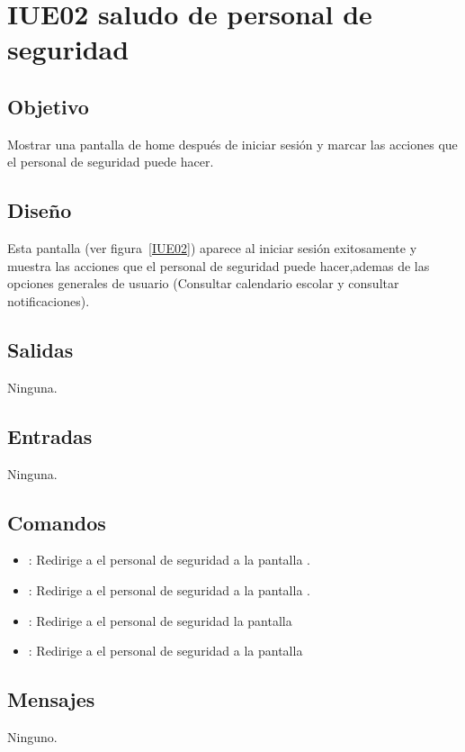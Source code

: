\section{IUE02 saludo de personal de seguridad}

\subsection{Objetivo}
Mostrar una pantalla de home después de iniciar sesión y marcar las acciones que el personal de seguridad puede hacer.

\subsection{Diseño}
Esta pantalla  (ver figura~\ref{IUE02}) aparece al iniciar sesión exitosamente y muestra las acciones que el personal de seguridad puede hacer,ademas de las opciones generales de usuario (Consultar calendario escolar y consultar notificaciones). 


\subsection{Salidas}

Ninguna.

\subsection{Entradas}
Ninguna.

\subsection{Comandos}
\begin{itemize}
	\item {}: Redirige a el personal de seguridad a la pantalla .
	
	\item {}: Redirige a el personal de seguridad a la pantalla .
	
	\item {}: Redirige a el personal de seguridad la pantalla 
	
	\item {}: Redirige a el personal de seguridad a la pantalla 
	
\end{itemize}

\subsection{Mensajes}

\begin{Citemize}
	\item Ninguno.
\end{Citemize}

